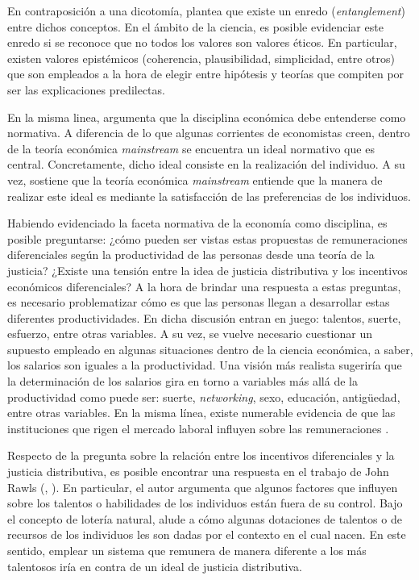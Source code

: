 En contraposición a una dicotomía, \citet{Putnam_2004} plantea que existe un enredo (\textit{entanglement}) entre dichos conceptos. En el ámbito de la ciencia, es posible evidenciar este enredo si se reconoce que no todos los valores son valores éticos. En particular, existen valores epistémicos (coherencia, plausibilidad, simplicidad, entre otros) que son empleados a la hora de elegir entre hipótesis y teorías que compiten por ser las explicaciones predilectas. 

En la misma linea, \citet{Davis_2022} argumenta que la disciplina económica debe entenderse como normativa. A diferencia de lo que algunas corrientes de economistas creen, dentro de la teoría económica \textit{mainstream} se encuentra un ideal normativo que es central. Concretamente, dicho ideal consiste en la realización del individuo. A su vez, \citet{Davis_2022} sostiene que la teoría económica \textit{mainstream} entiende que la manera de realizar este ideal es mediante la satisfacción de las preferencias de los individuos. 

Habiendo evidenciado la faceta normativa de la economía como disciplina, es posible preguntarse: ¿cómo pueden ser vistas estas propuestas de remuneraciones diferenciales según la productividad de las personas desde una teoría de la justicia? ¿Existe una tensión entre la idea de justicia distributiva y los incentivos económicos diferenciales? A la hora de brindar una respuesta a estas preguntas, es necesario problematizar cómo es que las personas llegan a desarrollar estas diferentes productividades. En dicha discusión entran en juego: talentos, suerte, esfuerzo, entre otras variables. A su vez, se vuelve necesario cuestionar un supuesto empleado en algunas situaciones dentro de la ciencia económica, a saber, los salarios son iguales a la productividad. Una visión más realista sugeriría que la determinación de los salarios gira en torno a variables más allá de la productividad como puede ser: suerte, \textit{networking}, sexo, educación, antigüedad, entre otras variables. En la misma línea, existe numerable evidencia de que las instituciones que rigen el mercado laboral influyen sobre las remuneraciones \citep{Blau_1999}.


Respecto de la pregunta sobre la relación entre los incentivos diferenciales y la justicia distributiva, es posible encontrar una respuesta en el trabajo de John Rawls (\citeyear{Rawls_1971}, \citeyear{Rawls_2002}). En particular, el autor argumenta que algunos factores que influyen sobre los talentos o habilidades de los individuos están fuera de su control. Bajo el concepto de lotería natural, \citet{Rawls_1971} alude a cómo algunas dotaciones de talentos o de recursos de los individuos les son dadas por el contexto en el cual nacen. En este sentido, emplear un sistema que remunera de manera diferente a los más talentosos iría en contra de un ideal de justicia distributiva.

